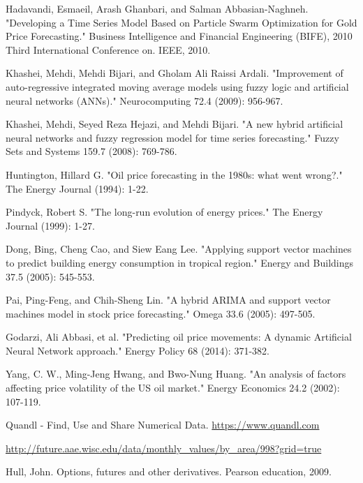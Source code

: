 \documentclass[runningheads]{llncs}
\begin{document}
\begin{thebibliography}{4}
Hadavandi, Esmaeil, Arash Ghanbari, and Salman Abbasian-Naghneh. "Developing a Time Series Model Based on Particle Swarm Optimization for Gold Price Forecasting." Business Intelligence and Financial Engineering (BIFE), 2010 Third International Conference on. IEEE, 2010.

Khashei, Mehdi, Mehdi Bijari, and Gholam Ali Raissi Ardali. "Improvement of auto-regressive integrated moving average models using fuzzy logic and artificial neural networks (ANNs)." Neurocomputing 72.4 (2009): 956-967.

Khashei, Mehdi, Seyed Reza Hejazi, and Mehdi Bijari. "A new hybrid artificial neural networks and fuzzy regression model for time series forecasting." Fuzzy Sets and Systems 159.7 (2008): 769-786.

 Huntington, Hillard G. "Oil price forecasting in the 1980s: what went wrong?." The Energy Journal (1994): 1-22.

 Pindyck, Robert S. "The long-run evolution of energy prices." The Energy Journal (1999): 1-27.

 Dong, Bing, Cheng Cao, and Siew Eang Lee. "Applying support vector machines to predict building energy consumption in tropical region." Energy and Buildings 37.5 (2005): 545-553.

 Pai, Ping-Feng, and Chih-Sheng Lin. "A hybrid ARIMA and support vector machines model in stock price forecasting." Omega 33.6 (2005): 497-505.

 Godarzi, Ali Abbasi, et al. "Predicting oil price movements: A dynamic Artificial Neural Network approach." Energy Policy 68 (2014): 371-382.

 Yang, C. W., Ming-Jeng Hwang, and Bwo-Nung Huang. "An analysis of factors affecting price volatility of the US oil market." Energy Economics 24.2 (2002): 107-119.

 Quandl - Find, Use and Share Numerical Data. \url{https://www.quandl.com}

\url{http://future.aae.wisc.edu/data/monthly_values/by_area/998?grid=true}

 Hull, John. Options, futures and other derivatives. Pearson education, 2009.

\end{thebibliography}
\end{document}
